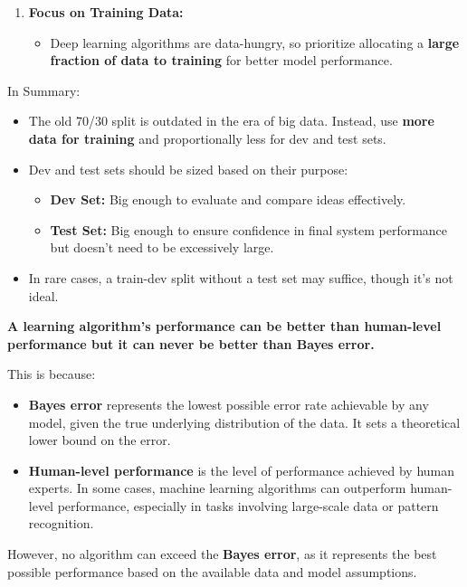 \documentclass[letterpaper,12pt,notitlepage,twoside]{report}
\begin{document}
\begin{enumerate}[label=\textbf{\arabic*.}]
    \item \textbf{Focus on Training Data:}
    \begin{itemize}
        \item Deep learning algorithms are data-hungry, so prioritize allocating a \textbf{large fraction of data to training} for better model performance.
    \end{itemize}
\end{enumerate}

In Summary:
\begin{itemize}[noitemsep, topsep=0pt]
    \item The old 70/30 split is outdated in the era of big data. Instead, use \textbf{more data for training} and proportionally less for dev and test sets.
    \item Dev and test sets should be sized based on their purpose:
    \begin{itemize}
        \item \textbf{Dev Set:} Big enough to evaluate and compare ideas effectively.
        \item \textbf{Test Set:} Big enough to ensure confidence in final system performance but doesn’t need to be excessively large.
    \end{itemize}
    \item In rare cases, a train-dev split without a test set may suffice, though it’s not ideal.
\end{itemize}

\textbf{A learning algorithm’s performance can be better than human-level performance but it can never be better than Bayes error.}

This is because:
\begin{itemize}[noitemsep, topsep=0pt]
\item \textbf{Bayes error} represents the lowest possible error rate achievable by any model, given the true underlying distribution of the data. It sets a theoretical lower bound on the error.
\item \textbf{Human-level performance} is the level of performance achieved by human experts. In some cases, machine learning algorithms can outperform human-level performance, especially in tasks involving large-scale data or pattern recognition.
\end{itemize}

However, no algorithm can exceed the \textbf{Bayes error}, as it represents the best possible performance based on the available data and model assumptions.
\end{document}
